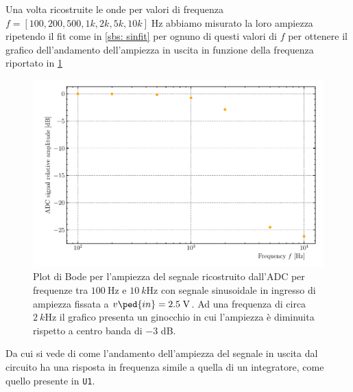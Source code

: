\documentclass[10pt, a4paper, italian]{article}
\begin{document}
Una volta ricostruite le onde per valori di frequenza $f = [100, 200, 500, 1k,
2k, 5k, 10k] \; \si{\Hz}$ abbiamo misurato la loro ampiezza ripetendo il fit
come in \cref{sbs: sinfit} per ognuno di questi valori di $f$ per ottenere il
grafico dell'andamento dell'ampiezza in uscita in funzione della frequenza
riportato in \cref{fig: bode}
\begin{figure}[htbp]
	\centering
	\includegraphics[width=\textwidth]{bode}
	\caption{Plot di Bode per l'ampiezza del segnale ricostruito dall'ADC per
	frequenze tra $\SI{100}{\Hz}$ e $\SI{10}{k\Hz}$ con segnale sinusoidale in
	ingresso di ampiezza fissata a $v\ped{in} = 2.5 \; \si{\V}$. Ad
	una frequenza di circa $\SI{2}{k\Hz}$ il grafico presenta un ginocchio in
	cui l'ampiezza è diminuita rispetto a centro banda di $-3$ dB.
	\label{fig: bode}}
\end{figure}
Da cui si vede di come l'andamento dell'ampiezza del segnale in uscita dal
circuito ha una risposta in frequenza simile a quella di un integratore, come
quello presente in \verb+U1+.
\end{document}
